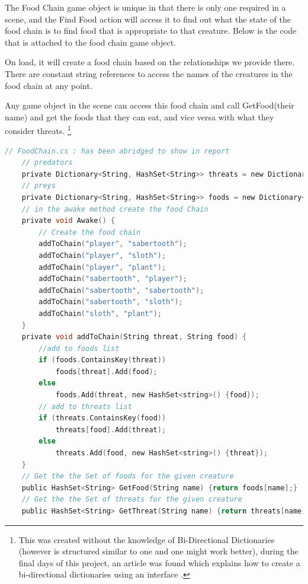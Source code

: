 \documentclass[11pt]{report}
\begin{document}
The Food Chain game object is unique in that there is only one required in a scene, and the Find Food action will access it to find out what the state of the food chain is to find food that is appropriate to that creature. Below is the code that is attached to the food chain game object.

On load, it will create a food chain based on the relationships we provide there. There are constant string references to access the names of the creatures in the food chain at any point.

Any game object in the scene can access this food chain and call GetFood(their name) and get the foods that they can eat, and vice versa with what they consider threats. \footnote{This was created without the knowledge of Bi-Directional Dictionaries (however is structured similar to one and one might work better), during the final days of this project, an article was found which explains how to create a bi-directional dictionaries using an interface \cite{biDirectionalDictionaries}.}

\begin{lstlisting}[language=c]
// FoodChain.cs : has been abridged to show in report
    // predators
    private Dictionary<String, HashSet<String>> threats = new Dictionary<string, HashSet<string>>();
    // preys
    private Dictionary<String, HashSet<String>> foods = new Dictionary<string, HashSet<string>>();
    // in the awake method create the food Chain
    private void Awake() {
        // Create the food chain
        addToChain("player", "sabertooth");
        addToChain("player", "sloth");
        addToChain("player", "plant");
        addToChain("sabertooth", "player");
        addToChain("sabertooth", "sabertooth");
        addToChain("sabertooth", "sloth");
        addToChain("sloth", "plant");
    }
    private void addToChain(String threat, String food) {
        //add to foods list
        if (foods.ContainsKey(threat)) 
            foods[threat].Add(food);
        else 
            foods.Add(threat, new HashSet<string>() {food});
        // add to threats list
        if (threats.ContainsKey(food)) 
            threats[food].Add(threat);
        else
            threats.Add(food, new HashSet<string>() {threat});
    }
    // Get the the Set of foods for the given creature
    public HashSet<String> GetFood(String name) {return foods[name];}
    // Get the the Set of threats for the given creature
    public HashSet<String> GetThreat(String name) {return threats[name];}
\end{lstlisting}
\end{document}
